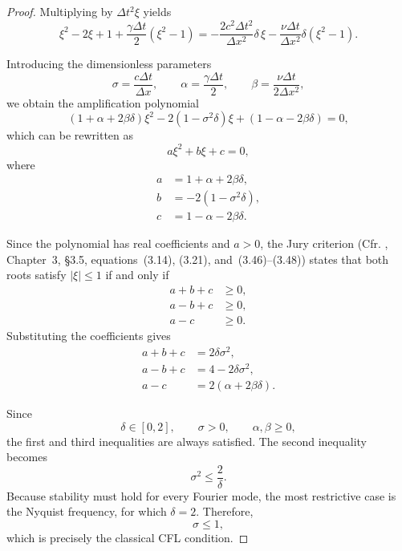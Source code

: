 \documentclass{Configuration_Files/PoliMi3i_thesis}
\begin{document}
\begin{proof}
Multiplying by $\Delta t^2\xi$ yields
\begin{equation*}
\xi^2-2\xi+1
+\frac{\gamma\Delta t}{2}\left(\xi^2-1\right)
=
-\frac{2c^2\Delta t^2}{\Delta x^2}\delta\,\xi
-
\frac{\nu\Delta t}{\Delta x^2}\delta
\left(\xi^2-1\right).
\end{equation*}

Introducing the dimensionless parameters
\begin{equation*}
\sigma=\frac{c\Delta t}{\Delta x},
\qquad
\alpha=\frac{\gamma\Delta t}{2},
\qquad
\beta=\frac{\nu\Delta t}{2\Delta x^2},
\end{equation*}
we obtain the amplification polynomial
\begin{equation*}
(1+\alpha+2\beta\delta)\xi^2
-2(1-\sigma^2\delta)\xi
+(1-\alpha-2\beta\delta)=0,
\end{equation*}
which can be rewritten as
\begin{equation*}
a\xi^2+b\xi+c=0,
\end{equation*}
where
\begin{align*}
a&=1+\alpha+2\beta\delta,\\
b&=-2(1-\sigma^2\delta),\\
c&=1-\alpha-2\beta\delta.
\end{align*}

Since the polynomial has real coefficients and $a>0$, the Jury criterion (Cfr. \cite{jury_theory_1973}, Chapter~3, \S3.5, equations~(3.14), (3.21), and~(3.46)–(3.48)) states
that both roots satisfy $|\xi|\le1$ if and only if
\begin{align*}
a+b+c&\ge0,\\
a-b+c&\ge0,\\
a-c&\ge0.
\end{align*}
Substituting the coefficients gives
\begin{align*}
a+b+c&=2\delta\sigma^2,\\
a-b+c&=4-2\delta\sigma^2,\\
a-c&=2(\alpha+2\beta\delta).
\end{align*}

Since
\[
\delta\in[0,2],
\qquad
\sigma>0, \qquad \alpha,\beta\ge0,
\]
the first and third inequalities are always satisfied. The second inequality
becomes
\begin{equation*}
\sigma^2\le\frac{2}{\delta}.
\end{equation*}
Because stability must hold for every Fourier mode, the most restrictive case
is the Nyquist frequency, for which $\delta=2$. Therefore,
\begin{equation*}
\sigma\le1,
\end{equation*}
which is precisely the classical CFL condition.
\end{proof}
\end{document}
